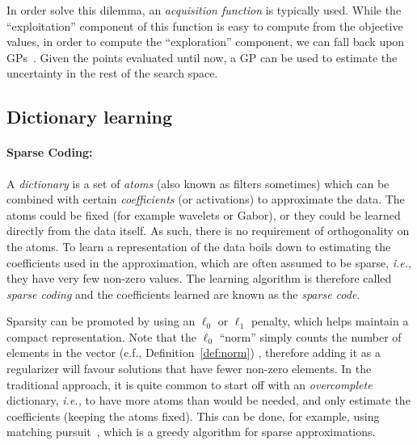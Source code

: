In order solve this dilemma, an \emph{acquisition function} is typically used. While the ``exploitation'' component of this function is easy to compute from the objective values, in order to compute the ``exploration'' component, we can fall back upon \acp{GP}~\citep{rasmussen2004gaussian}. Given the points evaluated until now, a \ac{GP} can be used to estimate the uncertainty in the rest of the search space. 


\subsection{Dictionary learning}
\label{sec:background_dict_learning}

\paragraph{Sparse Coding:} A \emph{dictionary} is a set of \emph{atoms} (also known as filters sometimes) which can be combined with certain \emph{coefficients} (or activations) to approximate the data. 
The atoms could be fixed (for example wavelets or Gabor), or they could be learned directly from the data itself. As such, there is no requirement of orthogonality on the atoms. 
To learn a representation of the data boils down to estimating the coefficients used in the approximation, which are often assumed to be sparse, \emph{i.e.}, they have very few non-zero values. 
The learning algorithm is therefore called \emph{sparse coding} and the coefficients learned are known as the \emph{sparse code}.

Sparsity can be promoted by using an $\ell_0$ or $\ell_1$ penalty, which helps maintain a compact representation. Note that the $\ell_0$ ``norm'' simply counts the number of elements in the vector (c.f., Definition~\ref{def:norm}) , therefore adding it as a regularizer will favour solutions that have fewer non-zero elements. In the traditional approach, it is quite common to start off with an \emph{overcomplete} dictionary, \emph{i.e.,} to have more atoms than would be needed, and only estimate the coefficients (keeping the atoms fixed). This can be done, for example, using matching pursuit~\citep{mallat1993matching}, which is a greedy algorithm for sparse approximations.


